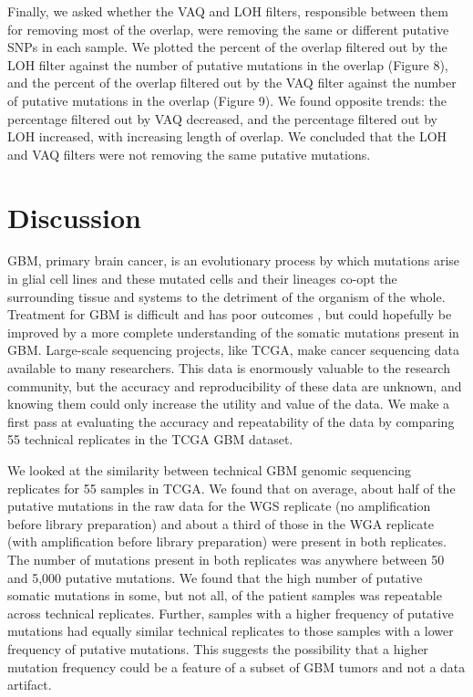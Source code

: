 \documentclass[11pt]{article} %
\begin{document}
Finally, we asked whether the VAQ and LOH filters, responsible between them for removing most of the overlap, were removing the same or different putative SNPs in each sample. We plotted the percent of the overlap filtered out by the LOH filter against the number of putative mutations in the overlap (Figure 8), and the percent of the overlap filtered out by the VAQ filter against the number of putative mutations in the overlap (Figure 9). We found opposite trends: the percentage filtered out by VAQ decreased, and the percentage filtered out by LOH increased, with increasing length of overlap. We concluded that the LOH and VAQ filters were not removing the same putative mutations. 

\section*{Discussion}

GBM, primary brain cancer, is an evolutionary process by which mutations arise in glial cell lines and these mutated cells and their lineages co-opt the surrounding tissue and systems to the detriment of the organism of the whole. Treatment for GBM is difficult and has poor outcomes \cite{GBM-treatments}, but could hopefully be improved by a more complete understanding of the somatic mutations present in GBM. Large-scale sequencing projects, like TCGA, make cancer sequencing data available to many researchers. This data is enormously valuable to the research community, but the accuracy and reproducibility of these data are unknown, and knowing them could only increase the utility and value of the data. We make a first pass at evaluating the accuracy and repeatability of the data by comparing 55 technical replicates in the TCGA GBM dataset.  

We looked at the similarity between technical GBM genomic sequencing replicates for 55 samples in TCGA. We found that on average, about half of the putative mutations in the raw data for the WGS replicate (no amplification before library preparation) and about a third of those in the WGA replicate (with amplification before library preparation) were present in both replicates. The number of mutations present in both replicates was anywhere between 50 and 5,000 putative mutations. We found that the high number of putative somatic mutations in some, but not all, of the patient samples was repeatable across technical replicates. Further, samples with a higher frequency of putative mutations had equally similar technical replicates to those samples with a lower frequency of putative mutations. This suggests the possibility that a higher mutation frequency could be a feature of a subset of GBM tumors and not a data artifact.
\end{document}
